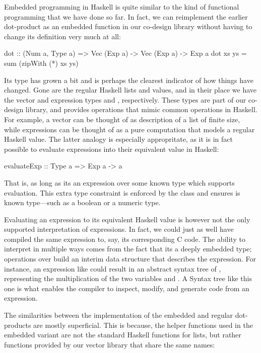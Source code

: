 \documentclass[../main.tex]{subfiles}
\begin{document}
Embedded programming in Haskell is quite similar to the kind of functional programming that we have done so far. In fact, we can reimplement the earlier dot-product as an embedded function in our co-design library without having to change its definition very much at all:

\begin{code}
dot :: (Num a, Type a) => Vec (Exp a) -> Vec (Exp a) -> Exp a
dot xs ys = sum (zipWith (*) xs ys)
\end{code}

\noindent Its type has grown a bit and is perhaps the clearest indicator of how things have changed. Gone are the regular Haskell lists and values, and in their place we have the vector and expression types  and , respectively. These types are part of our co-design library, and provides operations that mimic common operations in Haskell. For example, a vector can be thought of as description of a list of finite size, while expressions can be thought of as a pure computation that models a regular Haskell value. The latter analogy is especially appropritate, as it is in fact possible to evaluate expressions into their equivalent value in Haskell:

\begin{code}
evaluateExp :: Type a => Exp a -> a
\end{code}

\noindent That is, as long as its an expression over some known type  which supports evaluation. This extra type constraint is enforced by the  class and ensures  is known type---such as a boolean or a numeric type.

Evaluating an expression to its equivalent Haskell value is however not the only supported interpretation of expressions. In fact, we could just as well have compiled the same expression to, say, its corresponding C code. The ability to interpret  in multiple ways comes from the fact that its a deeply embedded type; operations over  build an interim data structure that describes the expression. For instance, an expression like  could result in an abstract syntax tree of , representing the multiplication of the two variables  and . A Syntax tree like this one is what enables the compiler to inspect, modify, and generate code from an expression.

The similarities between the implementation of the embedded and regular dot-products are mostly superficial. This is because, the helper functions used in the embedded variant are not the standard Haskell functions for lists, but rather functions provided by our vector library that share the same names:
\end{document}
